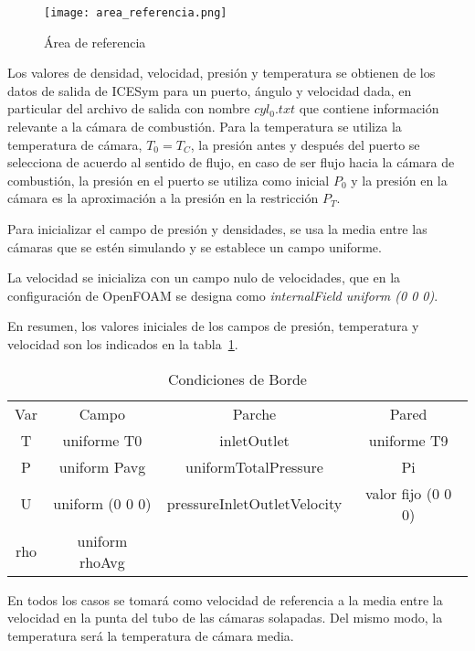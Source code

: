 \begin{figure}
    \centering
    \texttt{[image: area\_referencia.png]}
    \caption{Área de referencia}\label{fig:area_referencia}
\end{figure}

Los valores de densidad, velocidad, presión y temperatura se obtienen de los
datos de salida de ICESym para un puerto, ángulo y velocidad dada, en
particular del archivo de salida con nombre \emph{$cyl_0.txt$} que contiene
información relevante a la cámara de combustión.
%
Para la temperatura se utiliza la temperatura de cámara, $T_0 = T_C$, la
presión antes y después del puerto se selecciona de acuerdo al sentido de
flujo, en caso de ser flujo hacia la cámara de combustión, la presión en el
puerto se utiliza como inicial $P_0$ y la presión en la cámara es la
aproximación a la presión en la restricción $P_T$.

Para inicializar el campo de presión y densidades, se usa la media entre las
cámaras que se estén simulando y se establece un campo uniforme.

La velocidad se inicializa con un campo nulo de velocidades, que en la
configuración de OpenFOAM se designa como \emph{internalField uniform (0 0 0)}.

En resumen, los valores iniciales de los campos de presión, temperatura y velocidad
son los indicados en la tabla~\ref{tab:cc}.

\begin{table}
\centering
    \begin{tabular}{cccc} \toprule
        Var & Campo         & Parche                      & Pared \\
        T   & uniforme T0   & inletOutlet                 & uniforme T9\\ \midrule
        P   & uniform Pavg  & uniformTotalPressure        & Pi \\
        U   & uniform (0 0 0) & pressureInletOutletVelocity & valor fijo (0 0 0)\\
        rho & uniform rhoAvg \\ \bottomrule
    \end{tabular}
    \caption{Condiciones de Borde}\label{tab:cc}
\end{table}

En todos los casos se tomará como velocidad de referencia a la media entre la
velocidad en la punta del tubo de las cámaras solapadas.
%
Del mismo modo, la temperatura será la temperatura de cámara media.

